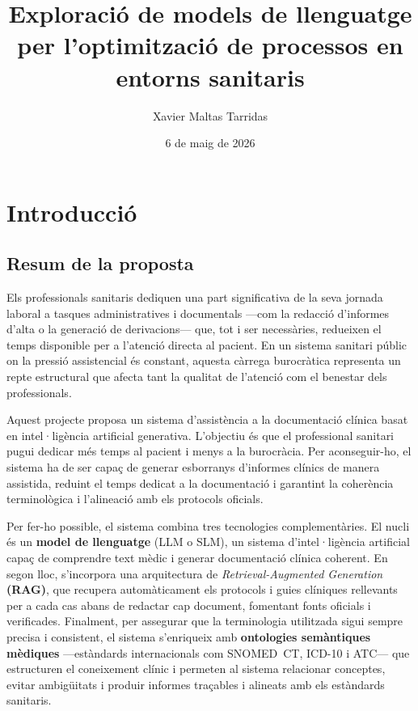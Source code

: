 \documentclass[CAT]{TFUOC}%
\title{Exploració de models de llenguatge per l'optimització de processos en entorns sanitaris}
\author{Xavier Maltas Tarridas}
\date{6 de maig de 2026}
\begin{document}
\estructura

\tableofcontents

\listoffigures

\listoftables




\chapter{Introducció}

\section{Resum de la proposta}

Els professionals sanitaris dediquen una part significativa de la seva jornada laboral a tasques administratives i documentals ---com la redacció d'informes d'alta o la generació de derivacions--- que, tot i ser necessàries, redueixen el temps disponible per a l'atenció directa al pacient. En un sistema sanitari públic on la pressió assistencial és constant, aquesta càrrega burocràtica representa un repte estructural que afecta tant la qualitat de l'atenció com el benestar dels professionals.

Aquest projecte proposa un sistema d'assistència a la documentació clínica basat en intel·ligència artificial generativa. L'objectiu és que el professional sanitari pugui dedicar més temps al pacient i menys a la burocràcia. Per aconseguir-ho, el sistema ha de ser capaç de generar esborranys d'informes clínics de manera assistida, reduint el temps dedicat a la documentació i garantint la coherència terminològica i l'alineació amb els protocols oficials.

Per fer-ho possible, el sistema combina tres tecnologies complementàries. El nucli és un \textbf{model de llenguatge} (LLM o SLM), un sistema d'intel·ligència artificial capaç de comprendre text mèdic i generar documentació clínica coherent. En segon lloc, s'incorpora una arquitectura de \textit{Retrieval-Augmented Generation} \textbf{(RAG)}, que recupera automàticament els protocols i guies clíniques rellevants per a cada cas abans de redactar cap document, fomentant fonts oficials i verificades. Finalment, per assegurar que la terminologia utilitzada sigui sempre precisa i consistent, el sistema s'enriqueix amb \textbf{ontologies semàntiques mèdiques} ---estàndards internacionals com SNOMED~CT, ICD-10 i ATC--- que estructuren el coneixement clínic i permeten al sistema relacionar conceptes, evitar ambigüitats i produir informes traçables i alineats amb els estàndards sanitaris.
\end{document}
